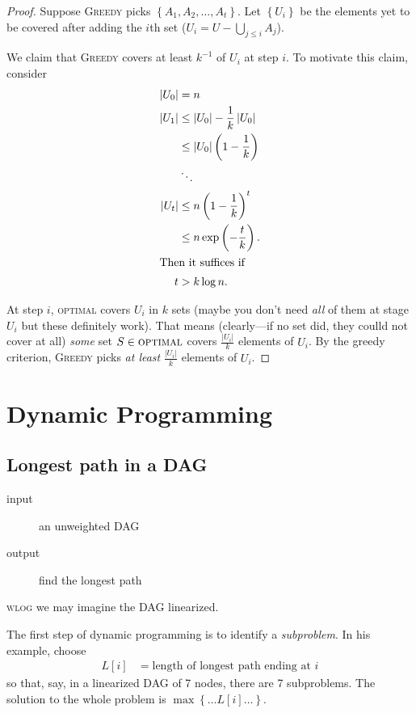 \begin{proof}
	Suppose \textsc{Greedy} picks
	\(\left\{A_1, A_2, \ldots, A_t\right\}\).
	Let
	\(\left\{U_i\right\}\)
	be the elements yet to be covered after adding the \(i\)th set
	(\(U_i = U - \bigcup_{j \leq i} A_j\)).
	
	We claim that \textsc{Greedy} covers at least \(k^{-1}\) of \(U_i\) at step \(i\).
	To motivate this claim, consider
	\begin{align}
		\left|U_0\right| &= n \\
		\left|U_1\right| &\leq \left|U_0\right| - \frac{1}{k}\left|U_0\right| \\
		&\leq \left|U_0\right| \left(1 - \frac{1}{k}\right) \\
		&\ddots \\
		\left|U_t\right| &\leq n\left(1 - \frac{1}{k}\right)^t \\
		&\leq n \exp \left(-\frac{t}{k}\right). \\
		\intertext{Then it suffices if}
		t &> k\log n.
	\end{align}
	
	At step \(i\), \textsc{optimal} covers \(U_i\) in \(k\) sets
	(maybe you don't need \emph{all} of them at stage \(U_i\) but these definitely work).
	That means (clearly---if no set did, they coulld not cover at all)
	\emph{some} set \(S \in \textsc{optimal}\) covers \(\frac{\left|U_i\right|}{k}\)
	elements of \(U_i\).
	By the greedy criterion, \textsc{Greedy} picks \emph{at least} \(\frac{\left|U_i\right|}{k}\)
	elements of \(U_i\).
\end{proof}

\section{Dynamic Programming}
\subsection{Longest path in a DAG}
\begin{description} 
	\item[input] an unweighted DAG
	\item[output] find the longest path
\end{description}
\textsc{wlog} we may imagine the DAG linearized.

The first step of dynamic programming is to identify a \emph{subproblem}. In his example, choose
\begin{align}
	L[i] &= \text{length of longest path ending at \(i\)}
\end{align}
so that, say, in a linearized DAG of 7 nodes,
there are 7 subproblems.
The solution to the whole problem is \(\max\left\{\ldots L[i] \ldots\right\} \).

